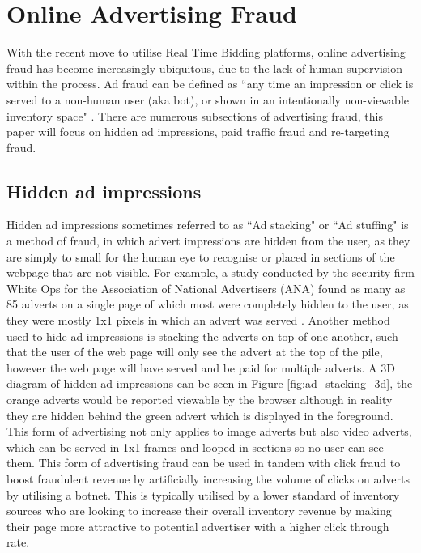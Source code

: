\documentclass[12pt]{article}
\begin{document}
\pagebreak

\section{Online Advertising Fraud}
With the recent move to utilise Real Time Bidding platforms, online advertising fraud has become increasingly ubiquitous, due to the lack of human supervision within the process. Ad fraud can be defined as ``any time an impression or click is served to a non-human user (aka bot), or shown in an intentionally non-viewable inventory space" \parencite{dstillery}. There are numerous subsections of advertising fraud, this paper will focus on hidden ad impressions, paid traffic fraud and re-targeting fraud.   


\subsection{Hidden ad impressions}
Hidden ad impressions sometimes referred to as ``Ad stacking" or ``Ad stuffing" is a method of fraud, in which advert impressions are hidden from the user, as they are simply to small for the human eye to recognise or placed in sections of the webpage that are not visible. For example, a study conducted by the security firm White Ops for the Association of National Advertisers (ANA) found as many as 85 adverts on a single page of which most were completely hidden to the user, as they were mostly 1x1 pixels in which an advert was served \parencite{botfraud2015}. Another method used to hide ad impressions is stacking the adverts on top of one another, such that the user of the web page will only see the advert at the top of the pile, however the web page will have served and be paid for multiple adverts. A 3D diagram of hidden ad impressions can be seen in Figure \ref{fig:ad_stacking_3d}, the orange adverts would be reported viewable by the browser although in reality they are hidden behind the green advert which is displayed in the foreground.  \\

This form of advertising not only applies to image adverts but also video adverts, which can be served in 1x1 frames and looped in sections so no user can see them. This form of advertising fraud can be used in tandem with click fraud to boost fraudulent revenue by artificially increasing the volume of clicks on adverts by utilising a botnet. This is typically utilised by a lower standard of inventory sources who are looking to increase their overall inventory revenue by making their page more attractive to potential advertiser with a higher click through rate.   \\
\end{document}
